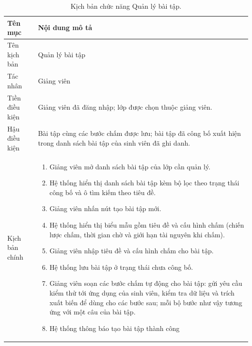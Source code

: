 \documentclass[../BTL.tex]{subfiles}
\begin{document}
\begin{table}[H]
\centering
\begin{tabularx}{\textwidth}{|p{3.2cm}|X|}
\hline
Tên mục & Nội dung mô tả \\ \hline
Tên kịch bản & Quản lý bài tập \\ \hline
Tác nhân & Giảng viên \\ \hline
Tiền điều kiện & Giảng viên đã đăng nhập; lớp được chọn thuộc giảng viên. \\ \hline
Hậu điều kiện & Bài tập cùng các bước chấm được lưu; bài tập đã công bố xuất hiện trong danh sách bài tập của sinh viên đã ghi danh. \\ \hline
Kịch bản chính &
\begin{enumerate}[leftmargin=*, nosep]
    \item Giảng viên mở danh sách bài tập của lớp cần quản lý.
    \item Hệ thống hiển thị danh sách bài tập kèm bộ lọc theo trạng thái công bố và ô tìm kiếm theo tiêu đề.
    \item Giảng viên nhấn nút tạo bài tập mới.
    \item Hệ thống hiển thị biểu mẫu gồm tiêu đề và cấu hình chấm (chiến lược chấm, thời gian chờ và giới hạn tài nguyên khi chấm).
    \item Giảng viên nhập tiêu đề và cấu hình chấm cho bài tập.
    \item Hệ thống lưu bài tập ở trạng thái chưa công bố.
    \item Giảng viên soạn các bước chấm tự động cho bài tập: gửi yêu cầu kiểm thử tới ứng dụng của sinh viên, kiểm tra dữ liệu và trích xuất biến để dùng cho các bước sau; mỗi bộ bước như vậy tương ứng với một câu của bài tập.
    \item Hệ thống thông báo tạo bài tập thành công
\end{enumerate} \\ \hline
\end{tabularx}
\caption{Kịch bản chức năng Quản lý bài tập.}
\label{tab:uc-assignment-management}
\end{table}
\end{document}
